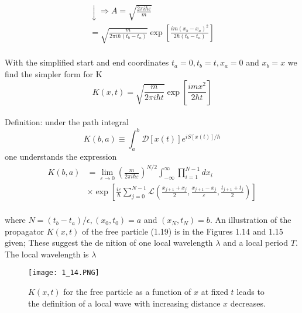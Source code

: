 \begin{equation}
\begin{array}{l}{\downarrow \Rightarrow A=\sqrt{\frac{2 \pi i \hbar \varepsilon}{m}}} \\ {=\sqrt{\frac{m}{2 \pi i \hbar\left(t_{b}-t_{a}\right)}} \exp \left[\frac{i m\left(x_{b}-x_{a}\right)^{2}}{2 \hbar\left(t_{b}-t_{a}\right)}\right]}\end{array}
\end{equation}\\
With the simplified start and end coordinates $t_a = 0, t_b = t, x_a = 0$
and $x_b = x$ we ​​find the simpler form for K
\\
\begin{equation}
K(x, t)=\sqrt{\frac{m}{2 \pi i \hbar t}} \exp \left[\frac{i m x^{2}}{2 \hbar t}\right]
\end{equation}\\
Definition: under the path integral
\begin{equation}
K(b, a) \equiv \int_{a}^{b} \mathcal{D}[x(t)] e^{i S[x(t)] / \hbar}
\end{equation}
one understands the expression
\\
\begin{equation}
\begin{aligned} K(b, a) &=\lim _{\varepsilon \rightarrow 0}\left(\frac{m}{2 \pi i \hbar \varepsilon}\right)^{N / 2} \int_{-\infty}^{\infty} \prod_{i=1}^{N-1} d x_{i} \\ & \times \exp \left[\frac{i \varepsilon}{\hbar} \sum_{j=0}^{N-1} \mathcal{L}\left(\frac{x_{j+1}+x_{j}}{2}, \frac{x_{j+1}-x_{j}}{\varepsilon}, \frac{t_{j+1}+t_{j}}{2}\right)\right] \end{aligned}
\end{equation}\\
where $N = (t_b - t_a) /\epsilon, (x_0, t_0) = a$ and $(x_N, t_N) = b$.
An illustration of the propagator $K (x, t)$ of the free particle (1.19) is in the
Figures 1.14 and 1.15 given; These suggest the de nition of one
local wavelength $\lambda$ and a local period $T$. The local wavelength is $\lambda$
\begin{figure}[ht]
    \centering
    \texttt{[image: 1\_14.PNG]}
    \caption{$K (x, t)$ for the free particle as a function of $x$ at fixed $t$ leads to the definition of a local wave with increasing
    distance $x$ decreases.}
    \label{fig:1.14}
\end{figure}
